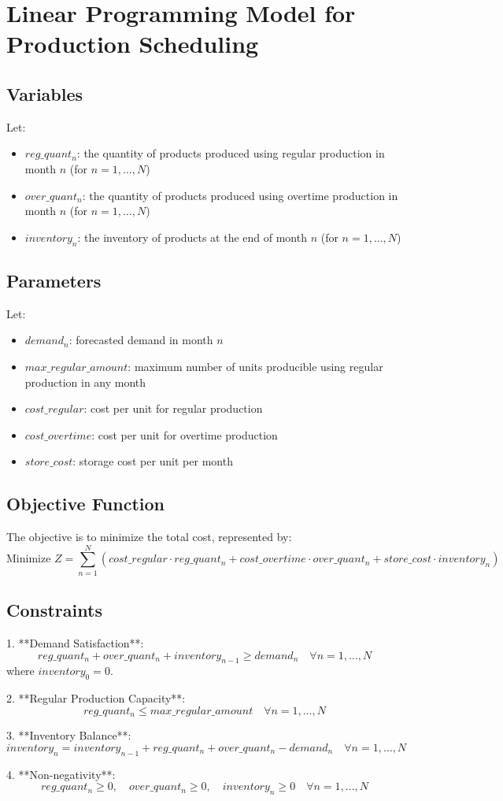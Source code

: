 \documentclass{article}
\begin{document}
\section*{Linear Programming Model for Production Scheduling}

\subsection*{Variables}
Let:
\begin{itemize}
    \item \( reg\_quant_n \): the quantity of products produced using regular production in month \( n \) (for \( n = 1, \ldots, N \))
    \item \( over\_quant_n \): the quantity of products produced using overtime production in month \( n \) (for \( n = 1, \ldots, N \))
    \item \( inventory_n \): the inventory of products at the end of month \( n \) (for \( n = 1, \ldots, N \))
\end{itemize}

\subsection*{Parameters}
Let:
\begin{itemize}
    \item \( demand_n \): forecasted demand in month \( n \)
    \item \( max\_regular\_amount \): maximum number of units producible using regular production in any month
    \item \( cost\_regular \): cost per unit for regular production
    \item \( cost\_overtime \): cost per unit for overtime production
    \item \( store\_cost \): storage cost per unit per month
\end{itemize}

\subsection*{Objective Function}
The objective is to minimize the total cost, represented by:
\[
\text{Minimize } Z = \sum_{n=1}^{N} \left( cost\_regular \cdot reg\_quant_n + cost\_overtime \cdot over\_quant_n + store\_cost \cdot inventory_n \right)
\]

\subsection*{Constraints}
1. **Demand Satisfaction**:
   \[
   reg\_quant_n + over\_quant_n + inventory_{n-1} \geq demand_n \quad \forall n = 1, \ldots, N
   \]
   where \( inventory_0 = 0 \).

2. **Regular Production Capacity**:
   \[
   reg\_quant_n \leq max\_regular\_amount \quad \forall n = 1, \ldots, N
   \]

3. **Inventory Balance**:
   \[
   inventory_n = inventory_{n-1} + reg\_quant_n + over\_quant_n - demand_n \quad \forall n = 1, \ldots, N
   \]

4. **Non-negativity**:
   \[
   reg\_quant_n \geq 0, \quad over\_quant_n \geq 0, \quad inventory_n \geq 0 \quad \forall n = 1, \ldots, N
   \]
\end{document}
